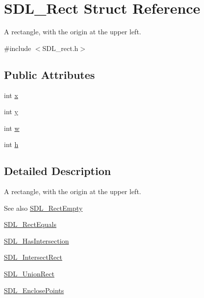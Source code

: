 \hypertarget{struct_s_d_l___rect}{}\section{S\+D\+L\+\_\+\+Rect Struct Reference}
\label{struct_s_d_l___rect}


A rectangle, with the origin at the upper left.  




{\ttfamily \#include $<$S\+D\+L\+\_\+rect.\+h$>$}

\subsection*{Public Attributes}
\begin{DoxyCompactItemize}
\item 
int \mbox{\hyperlink{struct_s_d_l___rect_a85418d94621dd6855805c4b5c7bf6482}{x}}
\item 
int \mbox{\hyperlink{struct_s_d_l___rect_a822694af8ddca5fd0d5d94e47106ab85}{y}}
\item 
int \mbox{\hyperlink{struct_s_d_l___rect_a56b7be5738fb6fab86881534a814c45e}{w}}
\item 
int \mbox{\hyperlink{struct_s_d_l___rect_a0a17d46b320af8063b746153348edd72}{h}}
\end{DoxyCompactItemize}


\subsection{Detailed Description}
A rectangle, with the origin at the upper left. 

\begin{DoxySeeAlso}{See also}
\mbox{\hyperlink{_s_d_l__rect_8h_aac0e9b5d3f34baec6a2cde95bb01f49c}{S\+D\+L\+\_\+\+Rect\+Empty}} 

\mbox{\hyperlink{_s_d_l__rect_8h_a156979fd3561cf90b87741d11057262a}{S\+D\+L\+\_\+\+Rect\+Equals}} 

\mbox{\hyperlink{_s_d_l__rect_8h_a191ec0b069421d4a36304b475697e847}{S\+D\+L\+\_\+\+Has\+Intersection}} 

\mbox{\hyperlink{_s_d_l__rect_8h_aff8e3dd3b1a25443cd7c8cf02a087290}{S\+D\+L\+\_\+\+Intersect\+Rect}} 

\mbox{\hyperlink{_s_d_l__rect_8h_a659f2c25335202888408c95195823f9c}{S\+D\+L\+\_\+\+Union\+Rect}} 

\mbox{\hyperlink{_s_d_l__rect_8h_afcbb58dbba760b9e6fdb4b5d1ece015c}{S\+D\+L\+\_\+\+Enclose\+Points}} 
\end{DoxySeeAlso}


